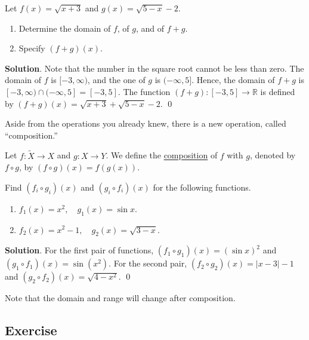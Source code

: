 \documentclass[11pt]{book}
\theoremstyle{break}
\theoremstyle{no_label}
\newcommand{\bbR}{\mathbb{R}}
\numberwithin{equation}{section}
\begin{document}
\setlength{\delimitershortfall}{13.5pt}

\begin{example}
    Let $f(x)=\sqrt{x+3}$ and $g(x)=\sqrt{5-x}-2$.
    \begin{enumerate}
        \item Determine the domain of $f$, of $g$, and of $f+g$.
        \item Specify $(f+g)(x)$.
    \end{enumerate}
\end{example}
\textbf{Solution}. Note that the number in the square root cannot be less than zero. The domain of $f$ is $[-3, \infty)$, and the one of $g$ is $(-\infty, 5]$. Hence, the domain of $f+g$ is $[-3, \infty)\cap(-\infty, 5]=[-3, 5]$. The function $(f+g):[-3, 5]\to\bbR$ is defined by $(f+g)(x)=\sqrt{x+3}+\sqrt{5-x}-2$. \qed

Aside from the operations you already knew, there is a new operation, called ``composition.''

\begin{definition}[Composition]
    Let $f:\tilde{X}\to X$ and $g:X\to Y$. We define the \underline{composition} of $f$ with $g$, denoted by $f\circ g$, by $(f\circ g)(x)=f(g(x))$.
\end{definition}

\begin{example}
    Find $(f_i\circ g_i)(x)$ and $(g_i\circ f_i)(x)$ for the following functions.
    \begin{enumerate}
        \item $f_1(x)=x^2, \quad g_1(x)=\sin x$.
        \item $f_2(x)=x^2-1, \quad g_2(x)=\sqrt{3-x}$.
    \end{enumerate}
\end{example}
\textbf{Solution}. For the first pair of functions, $(f_1\circ g_1)(x)=(\sin x)^2$ and $(g_1\circ f_1)(x)=\sin(x^2)$. For the second pair, $(f_2\circ g_2)(x)=|x-3|-1$ and $(g_2\circ f_2)(x)=\sqrt{4-x^2}$. \qed

Note that the domain and range will change after composition.

\subsection*{Exercise}

\setlength{\delimitershortfall}{0pt}
\end{document}
